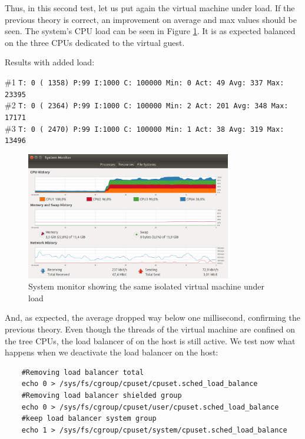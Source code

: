 \documentclass[]{scrartcl}
\begin{document}
Thus, in this second test, let us put again the virtual machine under load. If the previous theory is correct, an improvement on average and max values should be seen. The system's CPU load can be seen in Figure \ref{fig:test-cpuload}. It is as expected balanced on the three CPUs dedicated to the virtual guest.

\noindent Results with added load: 

\noindent \small \#1 \texttt{T: 0 ( 1358) P:99 I:1000 C: 100000 Min: 0 Act:   49 Avg:  337 Max:   23395}\\
\noindent \small \#2 \texttt{T: 0 ( 2364) P:99 I:1000 C: 100000 Min: 2 Act:  201 Avg:  348 Max:   17171}\\
\noindent \small \#3 \texttt{T: 0 ( 2470) P:99 I:1000 C: 100000 Min: 1 Act:   38 Avg:  319 Max:   13496}


\begin{figure}[t]
	\centering
	\includegraphics[width=0.8\textwidth]{test-cpuload}
	\caption{System monitor showing the same isolated virtual machine under load}
	\label{fig:test-cpuload}
\end{figure}

And, as expected, the average dropped way below one millisecond, confirming the previous theory.
Even though the threads of the virtual machine are confined on the tree CPUs, the load balancer of on the host is still active. We test now what happens when we deactivate the load balancer on the host:

\begin{verbatim}
	#Removing load balancer total
	echo 0 > /sys/fs/cgroup/cpuset/cpuset.sched_load_balance
	#Removing load balancer shielded group
	echo 0 > /sys/fs/cgroup/cpuset/user/cpuset.sched_load_balance
	#keep load balancer system group
	echo 1 > /sys/fs/cgroup/cpuset/system/cpuset.sched_load_balance
\end{verbatim}
\end{document}
